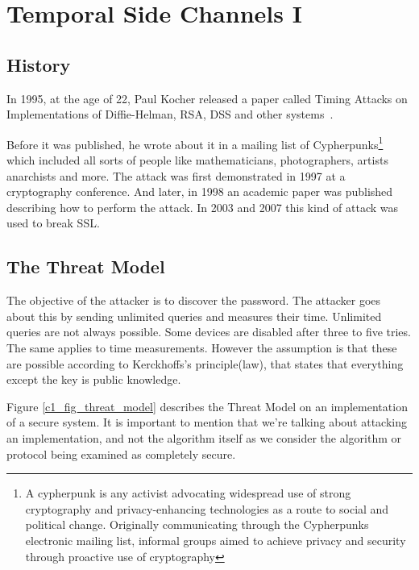\chapter{Temporal Side Channels I} 

\section{History}
In 1995, at the age of 22, Paul Kocher released a paper called Timing Attacks on
Implementations of Diffie-Helman, RSA, DSS and other
systems~\cite{kocher1996timing}.

Before it was published, he wrote about it in a mailing list of
Cypherpunks\footnote{A cypherpunk is any activist advocating widespread use of
strong cryptography and privacy-enhancing technologies as a route to social and
political change. Originally communicating through the Cypherpunks electronic
mailing list, informal groups aimed to achieve privacy and security through
proactive use of cryptography} which included all sorts of people like
mathematicians, photographers, artists anarchists and more. The attack was first
demonstrated in 1997 at a cryptography conference. And later, in 1998 an
academic paper was published describing how to perform the attack.
In 2003 and 2007 this kind of attack was used to break SSL.



\section{The Threat Model}
The objective of the attacker is to discover the password. The attacker goes about this by sending
unlimited queries and measures their time.
Unlimited queries are not always possible. Some devices are disabled after three to five tries.
The same applies to time measurements.
However the assumption is that these are possible according to Kerckhoffs's principle(law), 
that states that everything except the key is public knowledge. 

Figure \ref{c1_fig_threat_model} describes the Threat Model on an implementation
of a secure system. It is important to mention that we're talking about
attacking an implementation, and not the algorithm itself as we consider the
algorithm or protocol being examined as completely secure.

